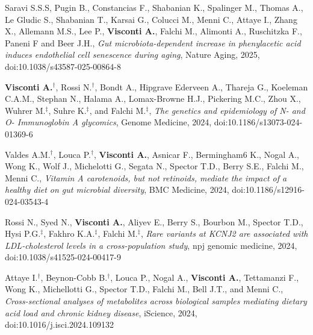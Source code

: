 {\begin{itemize}
		 Saravi S.S.S, Pugin B., Constancias F., Shabanian K., Spalinger M., Thomas A., Le Gludic S., Shabanian T., Karsai G.,  Colucci M., Menni C., Attaye I., Zhang X., Allemann M.S., Lee P., \textbf{Visconti A.}, Falchi M., Alimonti A., Ruschitzka F., Paneni F and Beer J.H., \emph{Gut microbiota-dependent increase in phenylacetic acid induces endothelial cell senescence during aging}, Nature Aging, 2025, doi:10.1038/s43587-025-00864-8

		  \textbf{Visconti A.}$^{\textbf{$\dag $}}$, Rossi N.$^{\textbf{$\dag $}}$, Bondt A., Hipgrave Ederveen A., Thareja G., Koeleman C.A.M., Stephan N., Halama A., Lomax-Browne H.J., Pickering M.C., Zhou X., Wuhrer M.$^{\textbf{$\ddag $}}$, Suhre K.$^{\textbf{$\ddag $}}$, and Falchi M.$^{\textbf{$\ddag $}}$, \emph{The genetics and epidemiology of N- and O- Immunoglobin A glycomics}, Genome Medicine, 2024, doi:10.1186/s13073-024-01369-6
		
		  Valdes A.M.$^{\textbf{$\dag $}}$, Louca P.$^{\textbf{$\dag $}}$, \textbf{Visconti A.}, Asnicar F., Bermingham6 K., Nogal A., Wong K., Wolf J., Michelotti G., Segata N., Spector T.D., Berry S.E.,  Falchi M., Menni C., \emph{Vitamin A carotenoids, but not retinoids, mediate the impact of a healthy diet on gut microbial diversity}, BMC Medicine, 2024, doi:10.1186/s12916-024-03543-4
		
		 Rossi N., Syed N., \textbf{Visconti A.}, Aliyev E., Berry S., Bourbon M., Spector T.D., Hysi P.G.$^{\textbf{$\ddag $}}$, Fakhro K.A.$^{\textbf{$\ddag $}}$, Falchi M.$^{\textbf{$\ddag $}}$, \emph{Rare variants at KCNJ2 are associated with LDL-cholesterol levels in a cross-population study}, npj genomic medicine, 2024, doi:10.1038/s41525-024-00417-9 
		
		 Attaye I.$^{\textbf{$\dag $}}$, Beynon-Cobb B.$^{\textbf{$\dag $}}$, Louca P., Nogal A., \textbf{Visconti A.}, Tettamanzi F., Wong K., Michellotti G., Spector T.D.,  Falchi M., Bell J.T., and Menni C., \emph{Cross-sectional analyses of metabolites across biological samples mediating dietary acid load and chronic kidney disease}, iScience, 2024, doi:10.1016/j.isci.2024.109132
		
	\end{itemize}
}


